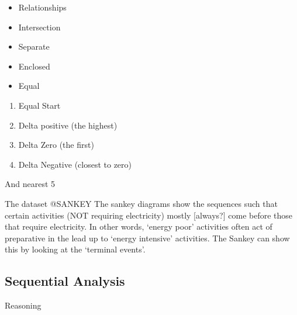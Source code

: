 \documentclass[11pt]{article}
\providecommand{\tightlist}{%
      \setlength{\itemsep}{0pt}\setlength{\parskip}{0pt}}
\begin{document}
\begin{itemize}
\item
  Relationships
\item
  Intersection
\item
  Separate
\item
  Enclosed
\item
  Equal
\end{itemize}

\begin{enumerate}
\def\labelenumi{\arabic{enumi}.}
\tightlist
\item
  Equal Start
\item
  Delta positive (the highest)
\item
  Delta Zero (the first)
\item
  Delta Negative (closest to zero)
\end{enumerate}

And nearest 5

The dataset @SANKEY The sankey diagrams show the sequences such that
certain activities (NOT requiring electricity) mostly {[}always?{]} come
before those that require electricity. In other words, `energy poor'
activities often act of preparative in the lead up to `energy intensive'
activities. The Sankey can show this by looking at the `terminal
events'.

    \hypertarget{sequential-analysis}{%
\subsection{Sequential Analysis}\label{sequential-analysis}}

    Reasoning
\end{document}
